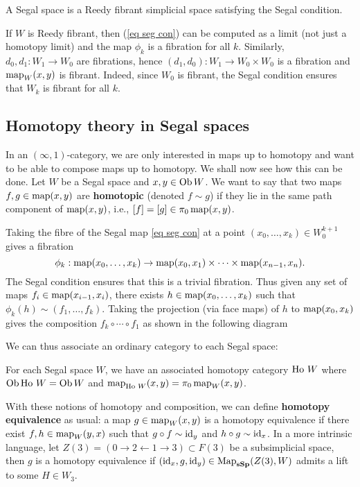 \begin{refsection}
\begin{defin}
A Segal space is a Reedy fibrant simplicial space satisfying the Segal condition.
\end{defin}
If $W$ is Reedy fibrant, then (\ref{eq seg con}) can be computed as a limit (not just a homotopy limit) and the map $\phi_k$ is a fibration for all $k$. Similarly, $d_0,d_1:W_1\to W_0$ are fibrations, hence $(d_1,d_0):W_1\to W_0\times W_0$ is a fibration and $\operatorname{\mathrm{map}}_W(x,y)$ is fibrant. Indeed, since $W_0$ is fibrant, the Segal condition ensures that $W_k$ is fibrant for all $k$. 

\subsection{Homotopy theory in Segal spaces}
In an $(\infty,1)$-category, we are only interested in maps up to homotopy and want to be able to compose maps up to homotopy. We shall now see how this can be done. Let $W$ be a Segal space and $x,y\in\operatorname{Ob} W$. We want to say that two maps $f,g\in\operatorname{\mathrm{map}}(x,y)$ are \textbf{homotopic} (denoted $f\sim g$) if they lie in the same path component of $\operatorname{\mathrm{map}}(x,y)$, i.e., $[f]=[g]\in\pi_0\operatorname{\mathrm{map}}(x,y)$.

Taking the fibre of the Segal map \ref{eq seg con} at a point $(x_0,\ldots,x_k)\in W_0^{k+1}$ gives a fibration
$$\phi_k:\operatorname{\mathrm{map}}(x_0,\ldots,x_k)\to\operatorname{\mathrm{map}}(x_0,x_1)\times\cdots\times\operatorname{\mathrm{map}}(x_{n-1},x_n).$$
The Segal condition ensures that this is a trivial fibration. Thus given any set of maps $f_i\in\operatorname{\mathrm{map}}(x_{i-1},x_i)$, there exists $h\in\operatorname{\mathrm{map}}(x_0,\ldots,x_k)$ such that $\phi_k(h)\sim (f_1,\ldots,f_k)$. Taking the projection (via face maps) of $h$ to $\operatorname{\mathrm{map}}(x_0,x_k)$ gives the composition $f_k\circ\cdots\circ f_1$ as shown in the following diagram
\centerline{
}

We can thus associate an ordinary category to each Segal space:
\begin{prop}
For each Segal space $W$, we have an associated homotopy category $\operatorname{\mathrm{Ho} \,} W$ where $\operatorname{Ob}\operatorname{\mathrm{Ho} \,} W=\operatorname{Ob} W$ and $\operatorname{\mathrm{map}}_{\operatorname{\mathrm{Ho} \,} W}(x,y)=\pi_0\operatorname{\mathrm{map}}_W(x,y)$.
\end{prop}

With these notions of homotopy and composition, we can define \textbf{homotopy equivalence} as usual: a map $g\in\operatorname{\mathrm{map}}_W(x,y)$ is a homotopy equivalence if there exist $f,h\in\operatorname{\mathrm{map}}_W(y,x)$ such that $g\circ f\sim\mathrm{id}_y$ and $h\circ g\sim\mathrm{id}_x$. In a more intrinsic language, let $Z(3)=(0\to2\leftarrow 1\to 3)\subset F(3)$ be a subsimplicial space, then $g$ is a homotopy equivalence if $(\mathrm{id}_x,g,\mathrm{id}_y)\in\operatorname{\mathrm{Map}}_{\mathbf{sSp}}(Z(3),W)$ admits a lift to some $H\in W_3$.


\end{refsection}
